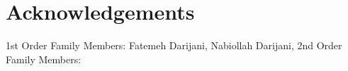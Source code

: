 \chapter*{Acknowledgements}


1st Order Family Members:
Fatemeh Darijani, Nabiollah Darijani, 
2nd Order Family Members:





\endinput